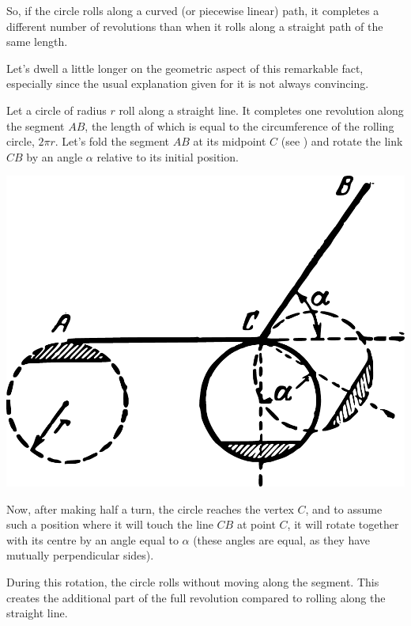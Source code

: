 So, if the circle rolls along a curved (or piecewise linear) path, it completes a different number of revolutions than when it rolls along a straight path of the same length.

Let's dwell a little longer on the geometric aspect of this remarkable fact, especially since the usual explanation given for it is not always convincing.

Let a circle of radius $ r $ roll along a straight line. It completes one revolution along the segment $ AB $, the length of which is equal to the circumference of the rolling circle, $ 2\pi r $. Let's fold the segment $ AB $ at its midpoint $ C $ (see ) and rotate the link $ CB $ by an angle $ \alpha $ relative to its initial position.

\begin{marginfigure}%
\centering
\includegraphics[width=\textwidth]{figures/ch-09/fig-128.pdf}
\end{marginfigure}

Now, after making half a turn, the circle reaches the vertex $ C $, and to assume such a position where it will touch the line $ CB $ at point $ C $, it will rotate together with its centre by an angle equal to $ \alpha $ (these angles are equal, as they have mutually perpendicular sides).

During this rotation, the circle rolls without moving along the segment. This creates the additional part of the full revolution compared to rolling along the straight line.

